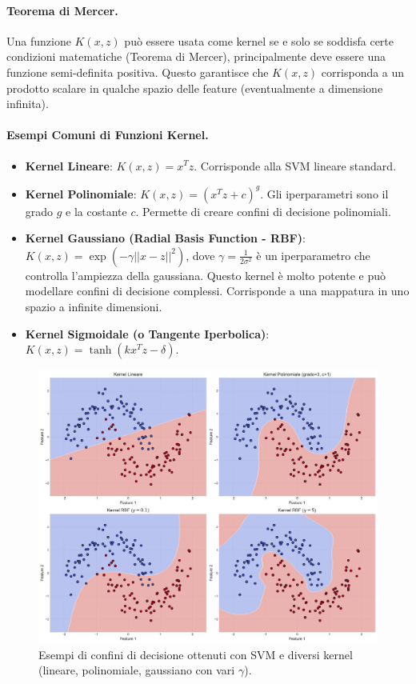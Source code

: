 \documentclass{article}
\begin{document}
\paragraph{Teorema di Mercer.}
Una funzione $K(x,z)$ può essere usata come kernel se e solo se soddisfa certe condizioni matematiche (Teorema di Mercer), principalmente deve essere una funzione semi-definita positiva. Questo garantisce che $K(x,z)$ corrisponda a un prodotto scalare in qualche spazio delle feature (eventualmente a dimensione infinita).

\paragraph{Esempi Comuni di Funzioni Kernel.}
\begin{itemize}
    \item \textbf{Kernel Lineare}: $K(x,z) = x^T z$. Corrisponde alla SVM lineare standard.
    \item \textbf{Kernel Polinomiale}: $K(x,z) = (x^T z + c)^g$. Gli iperparametri sono il grado $g$ e la costante $c$. Permette di creare confini di decisione polinomiali.
    \item \textbf{Kernel Gaussiano (Radial Basis Function - RBF)}: $K(x,z) = \exp(-\gamma ||x-z||^2)$, dove $\gamma = \frac{1}{2\sigma^2}$ è un iperparametro che controlla l'ampiezza della gaussiana. Questo kernel è molto potente e può modellare confini di decisione complessi. Corrisponde a una mappatura in uno spazio a infinite dimensioni.
    \item \textbf{Kernel Sigmoidale (o Tangente Iperbolica)}: $K(x,z) = \tanh(k x^T z - \delta)$.
\end{itemize}

\begin{figure}[H]
    \centering
    \includegraphics[width=\textwidth]{images/svm_kernel_examples.pdf}
    \caption{Esempi di confini di decisione ottenuti con SVM e diversi kernel (lineare, polinomiale, gaussiano con vari $\gamma$).}
    \label{fig:svm_kernel_examples}
\end{figure}
\end{document}
